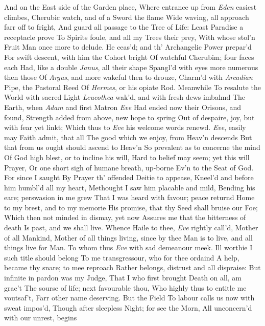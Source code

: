 \documentclass[11pt]{book}
\newcounter {first}
\begin{document}
And on the East side of the Garden place, 
Where entrance up from \textit{Eden} easiest climbes, 
Cherubic watch, and of a Sword the flame 
Wide waving, all approach farr off to fright, 
And guard all passage to the Tree of Life: 
Least Paradise a receptacle prove 
To Spirits foule, and all my Trees their prey, 
With whose stol'n Fruit Man once more to delude. 
\quad He ceas'd; and th' Archangelic Power prepar'd 
For swift descent, with him the Cohort bright 
Of watchful Cherubim; four faces each 
Had, like a double \textit{Janus}, all their shape 
Spangl'd with eyes more numerous then those 
Of \textit{Argus}, and more wakeful then to drouze, 
Charm'd with \textit{Arcadian} Pipe, the Pastoral Reed 
Of \textit{Hermes}, or his opiate Rod.  Meanwhile 
To resalute the World with sacred Light 
\textit{Leucothea} wak'd, and with fresh dews imbalmd 
The Earth, when \textit{Adam} and first Matron \textit{Eve} 
Had ended now their Orisons, and found, 
Strength added from above, new hope to spring 
Out of despaire, joy, but with fear yet linkt; 
Which thus to \textit{Eve} his welcome words renewd. 
\quad \textit{Eve}, easily may Faith admit, that all 
The good which we enjoy, from Heav'n descends 
But that from us ought should ascend to Heav'n 
So prevalent as to concerne the mind 
Of God high blest, or to incline his will, 
Hard to belief may seem; yet this will Prayer, 
Or one short sigh of humane breath, up-borne 
Ev'n to the Seat of God.  For since I saught 
By Prayer th' offended Deitie to appease, 
Kneel'd and before him humbl'd all my heart, 
Methought I saw him placable and mild, 
Bending his eare; perswasion in me grew 
That I was heard with favour; peace returnd 
Home to my brest, and to my memorie 
His promise, that thy Seed shall bruise our Foe; 
Which then not minded in dismay, yet now 
Assures me that the bitterness of death 
Is past, and we shall live.  Whence Haile to thee, 
\textit{Eve} rightly call'd, Mother of all Mankind, 
Mother of all things living, since by thee 
Man is to live, and all things live for Man. 
\quad To whom thus \textit{Eve} with sad demeanour meek. 
Ill worthie I such title should belong 
To me transgressour, who for thee ordaind 
A help, became thy snare; to mee reproach 
Rather belongs, distrust and all dispraise: 
But infinite in pardon was my Judge, 
That I who first brought Death on all, am grac't 
The sourse of life; next favourable thou, 
Who highly thus to entitle me voutsaf't, 
Farr other name deserving.  But the Field 
To labour calls us now with sweat impos'd, 
Though after sleepless Night; for see the Morn, 
All unconcern'd with our unrest, begins 
\end{document}
